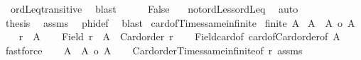 \begin{isabellebody}
\ {}{}\ ordLeq{\isacharunderscore}{\kern0pt}transitive\ \isamarkupfalse%
\ blast\isanewline
\ \ \ \ \isamarkupfalse%
\ False\ \isamarkupfalse%
\ {}{}\ not{\isacharunderscore}{\kern0pt}ordLess{\isacharunderscore}{\kern0pt}ordLeq\ \isamarkupfalse%
\ auto\isanewline
\ \ \isamarkupfalse%
\isanewline
\ \ \isamarkupfalse%
\ {\isacharquery}{\kern0pt}thesis\ \isamarkupfalse%
\ assms\ \isamarkupfalse%
\ phi{\isacharunderscore}{\kern0pt}def\ \isamarkupfalse%
\ blast\isanewline
{}\isamarkupfalse%
%
\endisatagproof
{\isafoldproof}%
%
\isadelimproof
\isanewline
%
\endisadelimproof
\isanewline
{}\isamarkupfalse%
\ card{\isacharunderscore}{\kern0pt}of{\isacharunderscore}{\kern0pt}Times{\isacharunderscore}{\kern0pt}same{\isacharunderscore}{\kern0pt}infinite{\isacharcolon}{\kern0pt}\isanewline
{}\ {\isachardoublequoteopen}{\isasymnot}finite\ A{\isachardoublequoteclose}\isanewline
{}\ {\isachardoublequoteopen}{\isacharbar}{\kern0pt}A\ {\isasymtimes}\ A{\isacharbar}{\kern0pt}\ {\isacharequal}{\kern0pt}o\ {\isacharbar}{\kern0pt}A{\isacharbar}{\kern0pt}{\isachardoublequoteclose}\isanewline
%
\isadelimproof
%
\endisadelimproof
%
\isatagproof
{}\isamarkupfalse%
{\isacharminus}{\kern0pt}\isanewline
\ \ \isamarkupfalse%
\ {\isacharquery}{\kern0pt}r\ {\isacharequal}{\kern0pt}\ {\isachardoublequoteopen}{\isacharbar}{\kern0pt}A{\isacharbar}{\kern0pt}{\isachardoublequoteclose}\isanewline
\ \ \isamarkupfalse%
\ {\isachardoublequoteopen}Field\ {\isacharquery}{\kern0pt}r\ {\isacharequal}{\kern0pt}\ A\ {\isasymand}\ Card{\isacharunderscore}{\kern0pt}order\ {\isacharquery}{\kern0pt}r{\isachardoublequoteclose}\isanewline
\ \ \isamarkupfalse%
\ Field{\isacharunderscore}{\kern0pt}card{\isacharunderscore}{\kern0pt}of\ card{\isacharunderscore}{\kern0pt}of{\isacharunderscore}{\kern0pt}Card{\isacharunderscore}{\kern0pt}order{\isacharbrackleft}{\kern0pt}of\ A{\isacharbrackright}{\kern0pt}\ \isamarkupfalse%
\ fastforce\isanewline
\ \ \isamarkupfalse%
\ {\isachardoublequoteopen}{\isacharbar}{\kern0pt}A\ {\isasymtimes}\ A{\isacharbar}{\kern0pt}\ {\isasymle}o\ {\isacharbar}{\kern0pt}A{\isacharbar}{\kern0pt}{\isachardoublequoteclose}\isanewline
\ \ \isamarkupfalse%
\ Card{\isacharunderscore}{\kern0pt}order{\isacharunderscore}{\kern0pt}Times{\isacharunderscore}{\kern0pt}same{\isacharunderscore}{\kern0pt}infinite{\isacharbrackleft}{\kern0pt}of\ {\isacharquery}{\kern0pt}r{\isacharbrackright}{\kern0pt}\ assms\ \isamarkupfalse%

\end{isabellebody}
